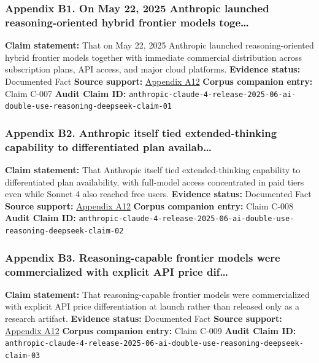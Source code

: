 \documentclass[
  american,
  11pt,
  letterpaper,
]{article}
\begin{document}
\subsubsection{Appendix B1. On May 22, 2025 Anthropic launched
reasoning-oriented hybrid frontier models
toge\ldots{}}\label{appendix-b1-on-may-22-2025-anthropic-launched-reasoning-oriented-hybrid-frontier-models-toge}

\textbf{Claim statement:} That on May 22, 2025 Anthropic launched
reasoning-oriented hybrid frontier models together with immediate
commercial distribution across subscription plans, API access, and major
cloud platforms. \textbf{Evidence status:} Documented Fact
\textbf{Source support:}
\hyperref[appendix-a12-introducing-claude-4]{Appendix A12}
\textbf{Corpus companion entry:} Claim C-007 \textbf{Audit Claim ID:}
\texttt{anthropic-claude-4-release-2025-06-ai-double-use-reasoning-deepseek-claim-01}

\subsubsection{Appendix B2. Anthropic itself tied extended-thinking
capability to differentiated plan
availab\ldots{}}\label{appendix-b2-anthropic-itself-tied-extended-thinking-capability-to-differentiated-plan-availab}

\textbf{Claim statement:} That Anthropic itself tied extended-thinking
capability to differentiated plan availability, with full-model access
concentrated in paid tiers even while Sonnet 4 also reached free users.
\textbf{Evidence status:} Documented Fact \textbf{Source support:}
\hyperref[appendix-a12-introducing-claude-4]{Appendix A12}
\textbf{Corpus companion entry:} Claim C-008 \textbf{Audit Claim ID:}
\texttt{anthropic-claude-4-release-2025-06-ai-double-use-reasoning-deepseek-claim-02}

\subsubsection{Appendix B3. Reasoning-capable frontier models were
commercialized with explicit API price
dif\ldots{}}\label{appendix-b3-reasoning-capable-frontier-models-were-commercialized-with-explicit-api-price-dif}

\textbf{Claim statement:} That reasoning-capable frontier models were
commercialized with explicit API price differentiation at launch rather
than released only as a research artifact. \textbf{Evidence status:}
Documented Fact \textbf{Source support:}
\hyperref[appendix-a12-introducing-claude-4]{Appendix A12}
\textbf{Corpus companion entry:} Claim C-009 \textbf{Audit Claim ID:}
\texttt{anthropic-claude-4-release-2025-06-ai-double-use-reasoning-deepseek-claim-03}
\end{document}
